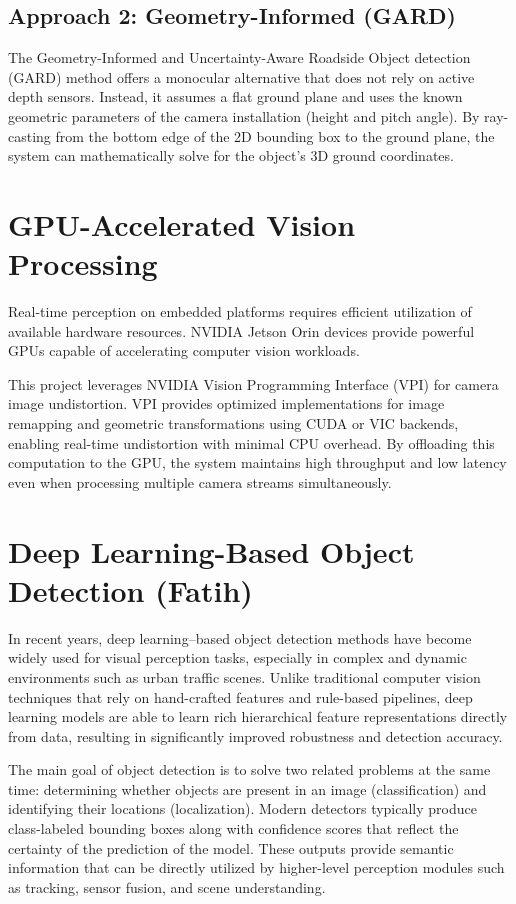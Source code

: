 \documentclass[12pt,a4paper]{report}
\begin{document}
\subsection{Approach 2: Geometry-Informed (GARD)}
The Geometry-Informed and Uncertainty-Aware Roadside Object detection (GARD) method offers a monocular alternative that does not rely on active depth sensors. Instead, it assumes a flat ground plane and uses the known geometric parameters of the camera installation (height and pitch angle). By ray-casting from the bottom edge of the 2D bounding box to the ground plane, the system can mathematically solve for the object's 3D ground coordinates.

\section{GPU-Accelerated Vision Processing}
Real-time perception on embedded platforms requires efficient utilization of available hardware resources. NVIDIA Jetson Orin devices provide powerful GPUs capable of accelerating computer vision workloads.

This project leverages NVIDIA Vision Programming Interface (VPI) for camera image undistortion. VPI provides optimized implementations for image remapping and geometric transformations using CUDA or VIC backends, enabling real-time undistortion with minimal CPU overhead. By offloading this computation to the GPU, the system maintains high throughput and low latency even when processing multiple camera streams simultaneously.

\section{Deep Learning-Based Object Detection (Fatih)}
In recent years, deep learning–based object detection methods have become widely used for visual perception tasks, especially in complex and dynamic environments such as urban traffic scenes. Unlike traditional computer vision techniques that rely on hand-crafted features and rule-based pipelines, deep learning models are able to learn rich hierarchical feature representations directly from data, resulting in significantly improved robustness and detection accuracy.

The main goal of object detection is to solve two related problems at the same time: determining whether objects are present in an image (classification) and identifying their locations (localization). Modern detectors typically produce class-labeled bounding boxes along with confidence
scores that reflect the certainty of the prediction of the model.  These outputs provide semantic information that can be directly utilized by higher-level perception modules such as tracking, sensor fusion, and scene understanding.
\end{document}
